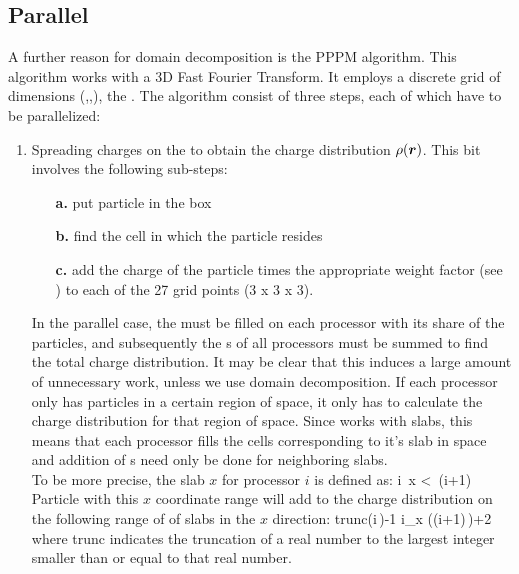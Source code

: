 \subsection{Parallel }
A further reason for domain decomposition is the PPPM algorithm. This
algorithm works with a 3D Fast Fourier Transform. It employs a
discrete grid of dimensions (\nx,\ny,\nz), the {\fftgrid}. The
algorithm consist of three steps, each of which have to be
parallelized:
\begin{enumerate}
\item	Spreading charges on the {\fftgrid} to obtain the charge 
	distribution $\rho(\mbox{\boldmath ${r}$})$.
	This bit involves the following sub-steps:
	\begin{enumerate}
	\item[{\bf a.}] put particle in the box
	\item[{\bf b.}] find the {\fftgrid} cell in which the particle resides
	\item[{\bf c.}] add the charge of the particle times the appropriate
			weight factor (see ) to 
			each of the 27 grid points (3 x 3 x 3).
	\end{enumerate}
	In the parallel case, the {\fftgrid} 
	must be filled on each processor with its
	share of the particles, and subsequently the {\fftgrid}s of all processors
	must be summed to find the total charge distribution. It may be clear that
	this induces a large amount of unnecessary work, unless we use domain
	decomposition. If each processor only has particles in a certain region
	of space, it only has to calculate the charge distribution for 
	that region of space. Since {\gromacs} works with slabs, this means that
	each processor fills the {\fftgrid} cells corresponding to it's slab in space
	and addition of {\fftgrid}s need only be done for neighboring slabs.\\
	To be more precise, the slab $x$ for processor $i$ is defined as:
	\beq
	i\,  \le x <\, (i+1)
	\eeq
	Particle with this $x$ coordinate range will add to the charge distribution
	on the following range of 
	of {\fftgrid} slabs in the $x$ direction:
	\beq
	{\rm trunc}\left(i\,\right)-1 \le i_x \left((i+1)\,\right)+2
	\eeq
	where trunc indicates the truncation of a real number to the largest integer
	smaller than or equal to that real number.
	

\end{enumerate}
